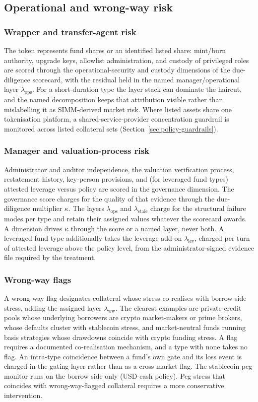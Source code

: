 \subsection{Operational and wrong-way risk}\label{sec:tax-ops}

\subsubsection{Wrapper and transfer-agent risk}
The token represents fund shares or an identified listed share: mint/burn authority, upgrade keys, allowlist administration, and custody of privileged roles are scored through the operational-security and custody dimensions of the due-diligence scorecard, with the residual held in the named manager/operational layer $\lambda_{\mathrm{ops}}$. For a short-duration type the layer stack can dominate the haircut, and the named decomposition keeps that attribution visible rather than mislabelling it as SIMM-derived market risk. Where listed assets share one tokenisation platform, a shared-service-provider concentration guardrail is monitored across listed collateral sets (Section~\ref{sec:policy-guardrails}).

\subsubsection{Manager and valuation-process risk}
Administrator and auditor independence, the valuation verification process, restatement history, key-person provisions, and (for leveraged fund types) attested leverage versus policy are scored in the governance dimension. The governance score charges for the quality of that evidence through the due-diligence multiplier $\kappa$. The layers $\lambda_{\mathrm{ops}}$ and $\lambda_{\mathrm{stale}}$ charge for the structural failure modes per type and retain their assigned values whatever the scorecard awards. A dimension drives $\kappa$ through the score or a named layer, never both. A leveraged fund type additionally takes the leverage add-on $\lambda_{\mathrm{lev}}$, charged per turn of attested leverage above the policy level, from the administrator-signed evidence file required by the treatment.

\subsubsection{Wrong-way flags}
A wrong-way flag designates collateral whose stress co-realises with borrow-side stress, adding the assigned layer $\lambda_{\mathrm{ww}}$. The clearest examples are private-credit pools whose underlying borrowers are crypto market-makers or prime brokers, whose defaults cluster with stablecoin stress, and market-neutral funds running basis strategies whose drawdowns coincide with crypto funding stress. A flag requires a documented co-realisation mechanism, and a type with none takes no flag. An intra-type coincidence between a fund's own gate and its loss event is charged in the gating layer rather than as a cross-market flag. The stablecoin peg monitor runs on the borrow side only (USD-cash policy). Peg stress that coincides with wrong-way-flagged collateral requires a more conservative intervention.

